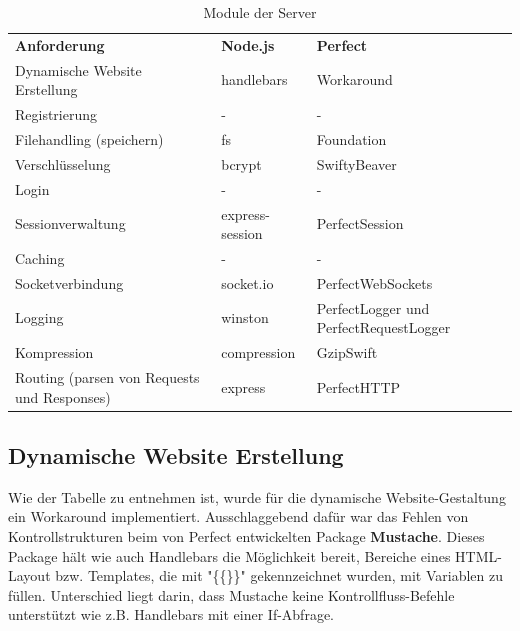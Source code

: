 \begin{table}[]
\begin{center}
\begin{tabular}{p{5cm}p{3.5cm}p{4.5cm}}
\rowcolor{gray20}	\textbf{Anforderung}									& \textbf{Node.js}	  		& \textbf{Perfect}								\\ 
\rowcolor{gray5}		Dynamische Website Erstellung							& handlebars					& Workaround								\\ 
\rowcolor{gray20}	Registrierung											& -							& -											\\ 
\rowcolor{gray5}		Filehandling (speichern)								& fs							& Foundation									\\ 
\rowcolor{gray20}	Verschlüsselung										& bcrypt						& SwiftyBeaver								\\ 
\rowcolor{gray5}		Login												& -							& -											\\
\rowcolor{gray20}	Sessionverwaltung									& express-session				& PerfectSession								\\ 
\rowcolor{gray5}		Caching												& - 							& - 											\\ 
\rowcolor{gray20}	Socketverbindung										& socket.io					& PerfectWebSockets							\\ 
\rowcolor{gray5}		Logging												& winston					& PerfectLogger und PerfectRequestLogger		\\ 
\rowcolor{gray20}	Kompression											& compression				& GzipSwift								\\ 
\rowcolor{gray5}		Routing (parsen von Requests und Responses)			& express					& PerfectHTTP								\\
\end{tabular}
\caption{Module der Server} \label{tab:modulederserver}
\end{center}
\end{table}

\subsection{Dynamische Website Erstellung}
Wie der Tabelle zu entnehmen ist, wurde für die dynamische Website-Gestaltung ein Workaround implementiert. Ausschlaggebend dafür war das Fehlen von Kontrollstrukturen beim von Perfect entwickelten Package \textbf{Mustache}. Dieses Package hält wie auch  Handlebars die Möglichkeit bereit, Bereiche eines HTML-Layout bzw. Templates, die mit "\{\{\}\}" gekennzeichnet wurden, mit Variablen zu füllen. Unterschied liegt darin, dass Mustache keine Kontrollfluss-Befehle unterstützt wie z.B. Handlebars mit einer If-Abfrage. 

